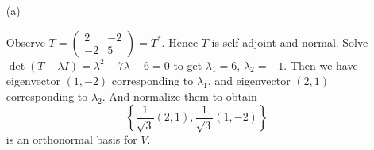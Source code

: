 \begin{Exercise}
\begin{enumerate}[(a)]
\item[(a)]
\begin{solution}
Observe $T = \begin{pmatrix}
2 & -2 \\
-2 & 5
\end{pmatrix} = T^*$. Hence $T$ is self-adjoint and normal. Solve $\det(T - \lambda I) = \lambda^2-7\lambda+6 = 0$ to get $\lambda_1 = 6$, $\lambda_2 = -1$. Then we have eigenvector $(1,-2)$ corresponding to $\lambda_1$, and eigenvector $(2,1)$ corresponding to $\lambda_2$. And normalize them to obtain $$
\left\{\frac{1}{\sqrt{3}}(2,1),\frac{1}{\sqrt{3}}(1,-2)\right\}
$$
is an orthonormal basis for $V$.
\end{solution}
\end{enumerate}
\end{Exercise}